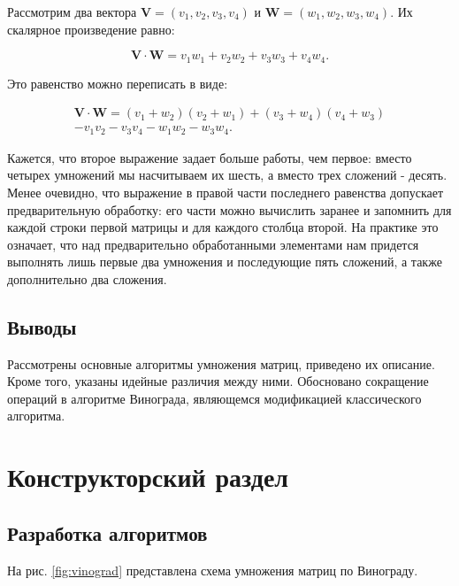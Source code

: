\documentclass[a4paper,12pt]{article}
\begin{document}
Рассмотрим два вектора $\mathbf{V} = (v_1, v_2, v_3, v_4)$
и $\mathbf{W} = (w_1, w_2, w_3, w_4)$. Их скалярное 
произведение равно:

\[
\mathbf{V} \cdot \mathbf{W} = v_1 w_1 + v_2 w_2 
+ v_3 w_3 + v_4 w_4.
\]

Это равенство можно переписать в виде:

\begin{multline}
	\mathbf{V} \cdot \mathbf{W} = (v_1 + w_2) (v_2 + w_1) 
	+ (v_3 + w_4) (v_4 + w_3) \\
	- v_1 v_2 - v_3 v_4 
	- w_1 w_2 - w_3 w_4.
\end{multline}

Кажется, что второе выражение задает больше работы, 
чем первое: вместо четырех умножений мы насчитываем их 
шесть, а вместо трех сложений - десять. Менее 
очевидно, что выражение в правой части последнего 
равенства допускает предварительную обработку: его 
части можно вычислить заранее и запомнить для каждой 
строки первой матрицы и для каждого столбца второй. На 
практике это означает, что над предварительно 
обработанными элементами нам придется выполнять лишь 
первые два умножения и последующие пять сложений, а 
также дополнительно два сложения.

\subsection*{Выводы}

Рассмотрены основные алгоритмы умножения матриц,
приведено их описание. Кроме того, указаны идейные 
различия между ними.
Обосновано сокращение операций в алгоритме
Винограда, являющемся модификацией
классического алгоритма.

\section{Конструкторский раздел}

\subsection{Разработка алгоритмов}

На рис. \ref{fig:vinograd} представлена схема 
умножения матриц по Винограду.

\newpage
\end{document}
